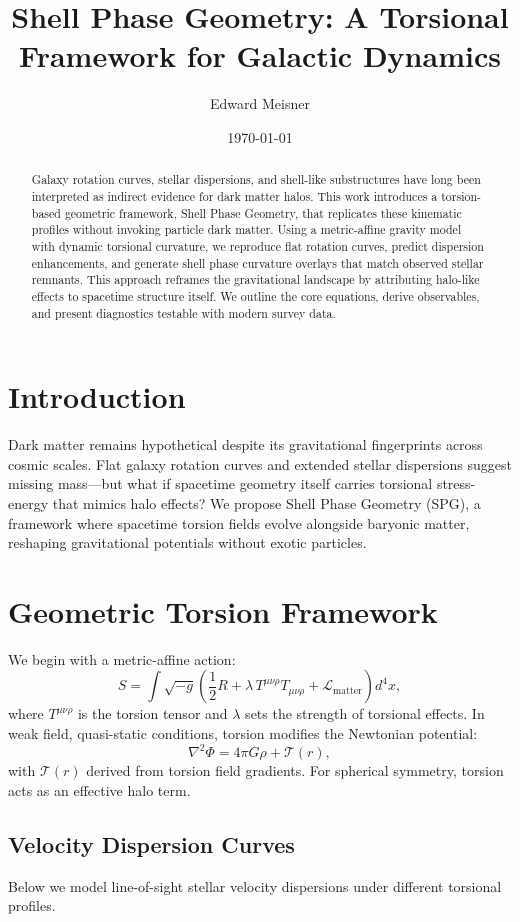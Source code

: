 \documentclass[11pt]{article}
\title{Shell Phase Geometry: A Torsional Framework for Galactic Dynamics}
\author[1]{Edward Meisner}
\affil[1]{Unaffiliated, Brooklyn, NY, United States \\ \texttt{[email@domain.com]}}
\date{\today}
\begin{document}
\maketitle

\begin{abstract}
Galaxy rotation curves, stellar dispersions, and shell-like substructures have long been interpreted as indirect evidence for dark matter halos. This work introduces a torsion-based geometric framework, Shell Phase Geometry, that replicates these kinematic profiles without invoking particle dark matter. Using a metric-affine gravity model with dynamic torsional curvature, we reproduce flat rotation curves, predict dispersion enhancements, and generate shell phase curvature overlays that match observed stellar remnants. This approach reframes the gravitational landscape by attributing halo-like effects to spacetime structure itself. We outline the core equations, derive observables, and present diagnostics testable with modern survey data.
\end{abstract}

\section{Introduction}
Dark matter remains hypothetical despite its gravitational fingerprints across cosmic scales. Flat galaxy rotation curves and extended stellar dispersions suggest missing mass—but what if spacetime geometry itself carries torsional stress-energy that mimics halo effects? We propose Shell Phase Geometry (SPG), a framework where spacetime torsion fields evolve alongside baryonic matter, reshaping gravitational potentials without exotic particles.

\section{Geometric Torsion Framework}
We begin with a metric-affine action:
\[
S = \int \sqrt{-g} \left( \frac{1}{2} R + \lambda \, T^{\mu\nu\rho} T_{\mu\nu\rho} + \mathcal{L}_\text{matter} \right) d^4x,
\]
where \( T^{\mu\nu\rho} \) is the torsion tensor and \( \lambda \) sets the strength of torsional effects. In weak field, quasi-static conditions, torsion modifies the Newtonian potential:
\[
\nabla^2 \Phi = 4\pi G \rho + \mathcal{T}(r),
\]
with \( \mathcal{T}(r) \) derived from torsion field gradients. For spherical symmetry, torsion acts as an effective halo term.

\subsection*{Velocity Dispersion Curves}
Below we model line-of-sight stellar velocity dispersions under different torsional profiles.
\end{document}

